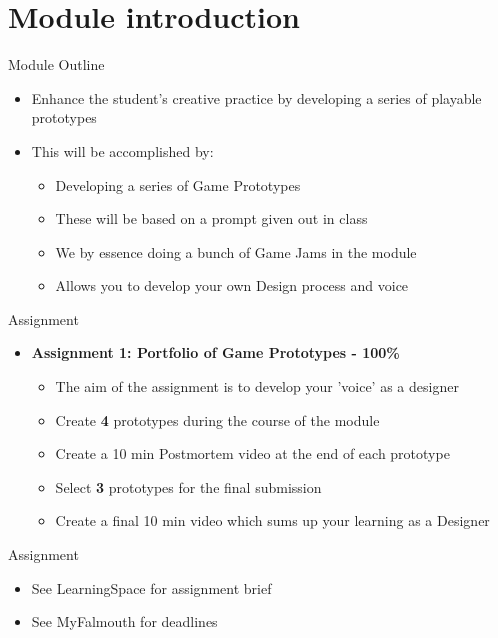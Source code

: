 \part{Module introduction}
\frame{\partpage}

\begin{frame}{Module Outline}
	\begin{itemize}
		\item Enhance the student’s creative practice by developing a series of playable prototypes
		\item This will be accomplished by:
		\begin{itemize}
			\item Developing a series of Game Prototypes
			\item These will be based on a prompt given out in class
			\item We by essence doing a bunch of Game Jams in the module
			\item Allows you to develop your own Design process and voice
		\end{itemize}
	\end{itemize}
\end{frame}


\begin{frame}{Assignment}
	\begin{itemize}
		\item \textbf{Assignment 1: Portfolio of Game Prototypes - 100\%}
			\begin{itemize}
				\item The aim of the assignment is to develop your 'voice' as a designer
				\item Create \textbf{4} prototypes during the course of the module
				\item Create a 10 min Postmortem video at the end of each prototype
				\item Select \textbf{3} prototypes for the final submission
				\item Create a final 10 min video which sums up your learning as a Designer
			\end{itemize}
	\end{itemize}
\end{frame}

\begin{frame}{Assignment}
	\begin{itemize}
		\item See LearningSpace for assignment brief
		\item See MyFalmouth for deadlines
	\end{itemize}
\end{frame}

